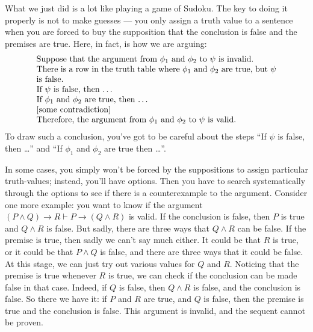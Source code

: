 What we just did is a lot like playing a game of Sudoku.  The key to
doing it properly is not to make guesses --- you only assign a truth
value to a sentence when you are forced to buy the supposition that the
conclusion is false and the premises are true.  Here, in fact, is how
we are arguing:
\[ \begin{array}{p{10cm}}
     Suppose that the argument from $\phi _1$ and $\phi _2$ to $\psi$
     is invalid. \\
     There is a row in the truth table where $\phi _1$ and $\phi _2$
     are true, but $\psi$ is false. \\
     If $\psi$ is false, then \dots \\
     If $\phi _1$ and $\phi _2$ are true, then \dots \\
     {[}some contradiction{]} \\
     Therefore, the argument from $\phi _1$ and $\phi _2$ to $\psi$ is
     valid. \end{array} \]
To draw such a conclusion, you've got to be careful about the steps
``If $\psi$ is false, then \dots '' and ``If $\phi _1$ and $\phi _2$
are true then \dots ''.

In some cases, you simply won't be forced by the suppositions to
assign particular truth-values; instead, you'll have options.  Then
you have to search systematically through the options to see if there
is a counterexample to the argument.  Consider one more example: you
want to know if the argument $(P\wedge Q)\to R\vdash P\to (Q\wedge R)$
is valid.  If the conclusion is false, then $P$ is true and
$Q\wedge R$ is false.  But sadly, there are three ways that
$Q\wedge R$ can be false.  If the premise is true, then sadly we can't
say much either.  It could be that $R$ is true, or it could be that
$P\wedge Q$ is false, and there are three ways that it could be false.
At this stage, we can just try out various values for $Q$ and $R$.
Noticing that the premise is true whenever $R$ is true, we can check
if the conclusion can be made false in that case.  Indeed, if $Q$ is
false, then $Q\wedge R$ is false, and the conclusion is false.  So
there we have it: if $P$ and $R$ are true, and $Q$ is false, then the
premise is true and the conclusion is false.  This argument is
invalid, and the sequent cannot be proven.

